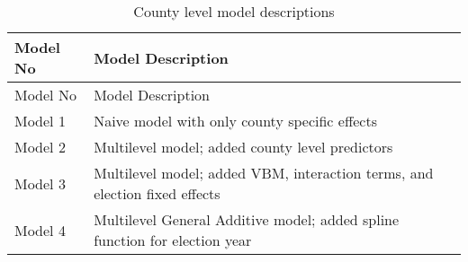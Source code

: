 \documentclass[12pt,twoside]{reedthesis}
\begin{document}
  \begin{longtable}[]{@{}ll@{}}
  \caption{County level model descriptions
  \label{tab:model_desc_county}}\tabularnewline
  \toprule
  \begin{minipage}[b]{0.15\columnwidth}\raggedright\strut
  Model No\strut
  \end{minipage} & \begin{minipage}[b]{0.80\columnwidth}\raggedright\strut
  Model Description\strut
  \end{minipage}\tabularnewline
  \midrule
  \endfirsthead
  \toprule
  \begin{minipage}[b]{0.15\columnwidth}\raggedright\strut
  Model No\strut
  \end{minipage} & \begin{minipage}[b]{0.80\columnwidth}\raggedright\strut
  Model Description\strut
  \end{minipage}\tabularnewline
  \midrule
  \endhead
  \begin{minipage}[t]{0.15\columnwidth}\raggedright\strut
  Model 1\strut
  \end{minipage} & \begin{minipage}[t]{0.80\columnwidth}\raggedright\strut
  Naive model with only county specific effects\strut
  \end{minipage}\tabularnewline
  \begin{minipage}[t]{0.15\columnwidth}\raggedright\strut
  Model 2\strut
  \end{minipage} & \begin{minipage}[t]{0.80\columnwidth}\raggedright\strut
  Multilevel model; added county level predictors\strut
  \end{minipage}\tabularnewline
  \begin{minipage}[t]{0.15\columnwidth}\raggedright\strut
  Model 3\strut
  \end{minipage} & \begin{minipage}[t]{0.80\columnwidth}\raggedright\strut
  Multilevel model; added VBM, interaction terms, and election fixed
  effects\strut
  \end{minipage}\tabularnewline
  \begin{minipage}[t]{0.15\columnwidth}\raggedright\strut
  Model 4\strut
  \end{minipage} & \begin{minipage}[t]{0.80\columnwidth}\raggedright\strut
  Multilevel General Additive model; added spline function for election
  year\strut
  \end{minipage}\tabularnewline
  \bottomrule
  \end{longtable}
  
\end{document}
